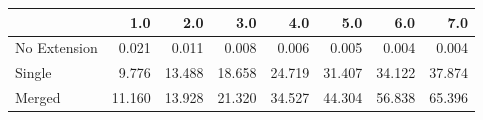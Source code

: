 \begin{tabular}{lrrrrrrr}
\toprule
{} &    1.0 &    2.0 &    3.0 &    4.0 &    5.0 &    6.0 &    7.0 \\
\midrule
No Extension &  0.021 &  0.011 &  0.008 &  0.006 &  0.005 &  0.004 &  0.004 \\
Single       &  9.776 & 13.488 & 18.658 & 24.719 & 31.407 & 34.122 & 37.874 \\
Merged       & 11.160 & 13.928 & 21.320 & 34.527 & 44.304 & 56.838 & 65.396 \\
\bottomrule
\end{tabular}
